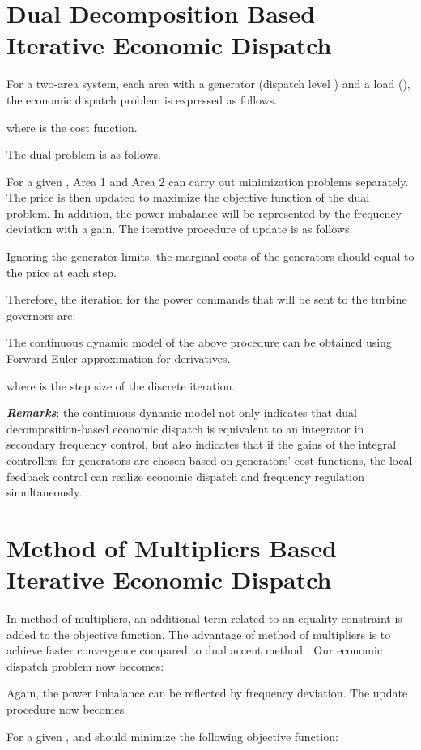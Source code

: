 \documentclass[10pt, journal, final, twocolumns]{IEEEtran}
\begin{document}
\section{Dual Decomposition Based Iterative Economic Dispatch}
For a two-area system, each area with a generator (dispatch level )  and a load (), the economic dispatch problem is expressed as follows.

where  is the cost function.

The dual problem is as follows.

For a given , Area 1 and Area 2 can carry out minimization problems separately. The price  is then updated to maximize the objective function of the dual problem. In addition, the power imbalance will be represented by the frequency deviation with a gain.
The iterative procedure of  update is as follows.

Ignoring the generator limits, the marginal costs of the generators should equal to the price at each step.


Therefore, the iteration for the power commands that will be sent to the turbine governors are:


The continuous dynamic model of the above procedure can be obtained using Forward Euler approximation for derivatives.

where  is the step size of the discrete iteration.

\emph{\textbf{Remarks}}: the continuous dynamic model not only indicates that dual decomposition-based economic dispatch is equivalent to an integrator in secondary frequency control, but also indicates that if the gains of the integral controllers for generators are chosen based on generators' cost functions, the local feedback control can realize economic dispatch and frequency regulation simultaneously.

\section{Method of Multipliers Based Iterative Economic Dispatch}
In method of multipliers, an additional term related to an equality constraint is added to the objective function. The advantage of method of multipliers is to achieve faster convergence compared to dual accent method \cite{boyd2011distributed}. Our economic dispatch problem now becomes:


Again, the power imbalance can be reflected by frequency deviation. The  update procedure now becomes


For a given ,  and  should minimize the following objective function:
\end{document}
